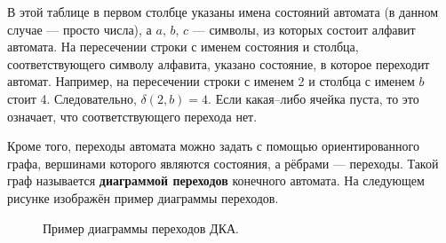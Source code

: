 \documentclass[10pt]{report}
\newcounter{exam}[section]
\begin{document}
В этой таблице в первом столбце указаны имена состояний автомата (в данном случае --- просто числа), а $a$, $b$, $c$ --- символы, из которых состоит алфавит автомата. На
пересечении строки с именем состояния и столбца, соответствующего символу алфавита, указано состояние, в которое переходит автомат. Например, на пересечении строки с именем
2 и столбца с именем $b$ стоит 4. Следовательно, $\delta(2,b)=4$. Если какая--либо ячейка пуста, то это означает, что соответствующего перехода нет.

Кроме того, переходы автомата можно задать с помощью ориентированного графа, вершинами которого являются состояния, а рёбрами --- переходы. Такой граф называется
\textbf{диаграммой переходов} конечного автомата. На следующем рисунке изображён пример диаграммы переходов.
\begin{figure}[!h]
\centering
{}
\vspace{-2mm}
\caption{Пример диаграммы переходов ДКА.}\label{Transition.diagramm.example}
\end{figure}
\end{document}
